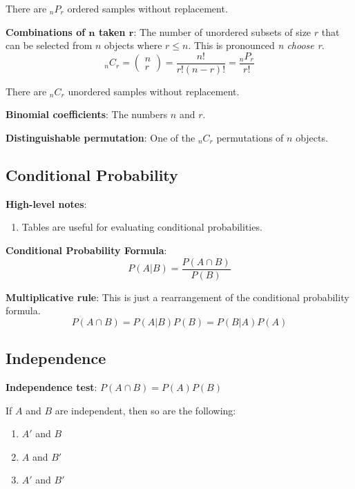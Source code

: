 \documentclass{article}
\begin{document}
\begin{multicols*}{2}
There are ${}_n P_r$ ordered samples without replacement.

\textbf{Combinations of $\mathbf{n}$ taken $\mathbf{r}$}: The number of unordered subsets of size $r$ that can be selected from $n$ objects where $r \leq n$. This is pronounced \textit{n choose r}.
\[{}_n C_r = \begin{pmatrix}
    n \\
    r
\end{pmatrix} = \frac{n!}{r! (n-r)!} = \frac{{}_n P_r}{r!}\]

There are ${}_n C_r$ unordered samples without replacement.

\textbf{Binomial coefficients}: The numbers $n$ and $r$.

\textbf{Distinguishable permutation}: One of the ${}_n C_r$ permutations of $n$ objects.

\subsection{Conditional Probability}

\textbf{High-level notes}:
\begin{enumerate}
    \item Tables are useful for evaluating conditional probabilities.
\end{enumerate}

\textbf{Conditional Probability Formula}:
\begin{equation*}
    P(A|B) = \frac{P(A \cap B)}{P(B)}
\end{equation*}

\textbf{Multiplicative rule}:
This is just a rearrangement of the conditional probability formula.
\begin{equation*}
    P(A \cap B) = P(A|B) P(B) = P(B|A) P(A)
\end{equation*}

\subsection{Independence}

\textbf{Independence test}: $P(A \cap B) = P(A) P(B)$

If $A$ and $B$ are independent, then so are the following:
\begin{enumerate}
    \item $A'$ and $B$
    \item $A$ and $B'$
    \item $A'$ and $B'$
\end{enumerate}


\end{multicols*}
\end{document}
